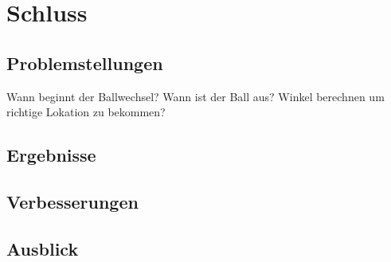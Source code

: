 \chapter{Schluss}
\section{Problemstellungen}
Wann beginnt der Ballwechsel?
Wann ist der Ball aus?
Winkel berechnen um richtige Lokation zu bekommen?
\section{Ergebnisse}
\section{Verbesserungen}
\section{Ausblick}